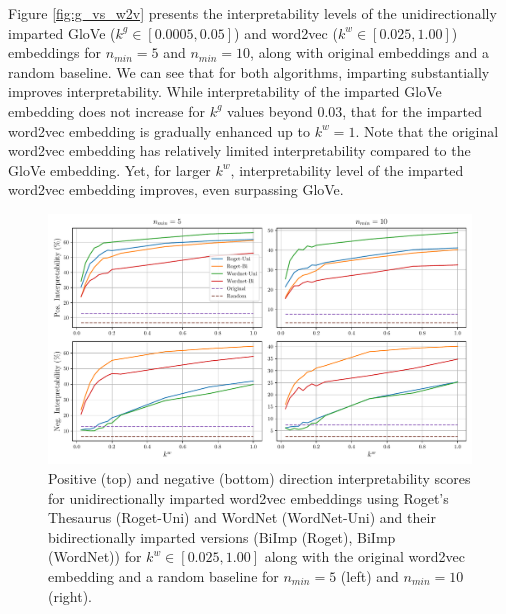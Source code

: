 \documentclass[11pt,a4paper]{article}
\def\proposedmethod{BiImp}
\begin{document}
Figure \ref{fig:g_vs_w2v} presents the interpretability levels of the unidirectionally imparted GloVe ($k^g \in [0.0005,0.05]$) and word2vec ($k^w \in [0.025,1.00]$) embeddings for $n_{min} = 5$ and $n_{min} = 10$, along with original embeddings and a random baseline. We can see that for both algorithms, imparting substantially improves interpretability. While interpretability of the imparted GloVe embedding does not increase for $k^g$ values beyond 0.03, that for the imparted word2vec embedding is gradually enhanced up to $k^w=1$. Note that the original word2vec embedding has relatively limited interpretability compared to the GloVe embedding.
Yet, for larger $k^w$, interpretability level of the imparted word2vec embedding improves, even surpassing GloVe. 

\begin{figure}
	\centering
	\includegraphics[width=16cm]{Figures/interpretability_wordnet_vs_roget.pdf}
	\caption{Positive (top) and negative (bottom)
          direction interpretability scores for
          unidirectionally imparted word2vec embeddings
          using Roget's Thesaurus (Roget-Uni) and WordNet
          (WordNet-Uni) and their bidirectionally imparted
          versions (\proposedmethod{} (Roget), \proposedmethod{} (WordNet)) for $k^w \in [0.025,1.00]$ along with the original word2vec embedding and a random baseline for $n_{min} = 5$ (left) and $n_{min} = 10$ (right).}
	\label{fig:wordnet_vs_roget}
\end{figure}
\end{document}
